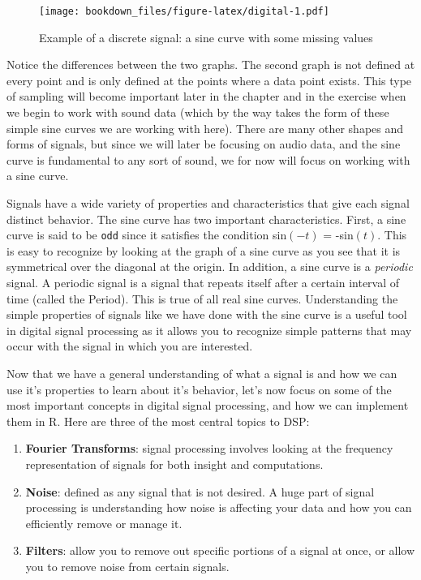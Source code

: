\documentclass[
]{krantz}
\providecommand{\tightlist}{%
  \setlength{\itemsep}{0pt}\setlength{\parskip}{0pt}}
\begin{document}
\begin{figure}
\centering
\texttt{[image: bookdown\_files/figure-latex/digital-1.pdf]}
\caption{\label{fig:digital}Example of a discrete signal: a sine curve with some missing values}
\end{figure}

Notice the differences between the two graphs. The second graph is not defined at every point and is only defined at the points where a data point exists. This type of sampling will become important later in the chapter and in the exercise when we begin to work with sound data (which by the way takes the form of these simple sine curves we are working with here). There are many other shapes and forms of signals, but since we will later be focusing on audio data, and the sine curve is fundamental to any sort of sound, we for now will focus on working with a sine curve.

Signals have a wide variety of properties and characteristics that give each signal distinct behavior. The sine curve has two important characteristics. First, a sine curve is said to be \texttt{odd} since it satisfies the condition sin\((-t)\) = -sin\((t)\). This is easy to recognize by looking at the graph of a sine curve as you see that it is symmetrical over the diagonal at the origin. In addition, a sine curve is a \emph{periodic} signal. A periodic signal is a signal that repeats itself after a certain interval of time (called the Period). This is true of all real sine curves. Understanding the simple properties of signals like we have done with the sine curve is a useful tool in digital signal processing as it allows you to recognize simple patterns that may occur with the signal in which you are interested.

Now that we have a general understanding of what a signal is and how we can use it's properties to learn about it's behavior, let's now focus on some of the most important concepts in digital signal processing, and how we can implement them in R. Here are three of the most central topics to DSP:

\begin{enumerate}
\def\labelenumi{\arabic{enumi}.}
\tightlist
\item
  \textbf{Fourier Transforms}: signal processing involves looking at the frequency representation of signals for both insight and computations.
\item
  \textbf{Noise}: defined as any signal that is not desired. A huge part of signal processing is understanding how noise is affecting your data and how you can efficiently remove or manage it.
\item
  \textbf{Filters}: allow you to remove out specific portions of a signal at once, or allow you to remove noise from certain signals.
\end{enumerate}
\end{document}
